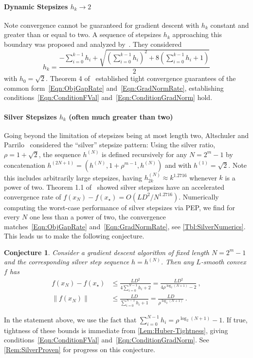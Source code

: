 \documentclass[11pt]{article}
\numberwithin{equation}{section}
\newtheorem{conjecture}[thm]{Conjecture}
\theoremstyle{definition}
\theoremstyle{definition}
\theoremstyle{definition}
\newcommand{\1}{\mathbf{1}}
\newcommand{\xStar}{x_\star}
\newcommand{\sumH}[1]{\sum_{i=0}^{#1} h_i}
\begin{document}
\paragraph{Dynamic Stepsizes $h_k \rightarrow 2$}
Note convergence cannot be guaranteed for gradient descent with $h_k$ constant and greater than or equal to two. A sequence of stepsizes $h_k$ approaching this boundary was proposed and analyzed by~\cite{Teboulle_4T_Analytical}. 
They considered
\begin{equation}\label{Eqn:DynamicStepsizes}
    h_k = \frac{-\sumH{k-1} + \sqrt{\left(\sumH{k-1} \right)^2 + 8\left(\sumH{k-1} + 1\right)}}{2}
\end{equation}
with $h_0 = \sqrt{2}$.
Theorem 4 of~\cite{Teboulle_4T_Analytical} established tight convergence guarantees of the common form~\eqref{Eqn:ObjGapRate} and~\eqref{Eqn:GradNormRate}, establishing conditions~\eqref{Eqn:ConditionFVal} and~\eqref{Eqn:ConditionGradNorm} hold.

\paragraph{Silver Stepsizes $h_k$ (often much greater than two)}
Going beyond the limitation of stepsizes being at most length two, Altschuler and Parrilo~\cite{Silver_Accel} considered the ``silver'' stepsize pattern:
Using the silver ratio, $\rho = 1+\sqrt{2}$, the sequence $h^{(N)}$ is defined recursively for any $N = 2^m -1$ by concatenation $h^{(2N+1)} = (h^{(N)},1+\rho^{m-1}, h^{(N)})$ and with $h^{(1)} = \sqrt{2}$. Note this includes arbitrarily large stepsizes, having $h^{(N)}_{2k} \approx k^{1.2716}$ whenever $k$ is a power of two.
Theorem 1.1 of~\cite{Silver_Accel} showed silver stepsizes have an accelerated convergence rate of $f(x_N)-f(\xStar) = O(LD^2/N^{1.2716})$. Numerically computing the worst-case performance of silver stepsizes via PEP, we find for every $N$ one less than a power of two, the convergence matches~\eqref{Eqn:ObjGapRate} and~\eqref{Eqn:GradNormRate}, see \cref{Tbl:SilverNumerics}. This leads us to make the following conjecture.
\begin{conjecture}\label{Conj:SilverRate}
    Consider a gradient descent algorithm of fixed length $N = 2^m - 1$ and the corresponding silver step sequence $h = h^{(N)}$. Then any $L$-smooth convex $f$ has
    \begin{align*}
        f(x_N) - f(\xStar) &\leq \frac{LD^2}{4 \sumH{N-1} + 2} = \frac{LD^2}{4\rho^{\log_2(N+1)} - 2} \ , \\ 
        \|f(x_N) \| &\leq \frac{LD}{ \sumH{N-1} + 1} = \frac{LD}{\rho^{\log_2(N+1)}} \ . 
    \end{align*}
\end{conjecture}
\noindent In the statement above, we use the fact that $\sumH{N-1} = \rho^{\log_2(N+1)} - 1$. If true, tightness of these bounds is immediate from \cref{Lem:Huber-Tightness}, giving conditions~\eqref{Eqn:ConditionFVal} and~\eqref{Eqn:ConditionGradNorm}.
See \cref{Rem:SilverProven} for progress on this conjecture.
\end{document}
